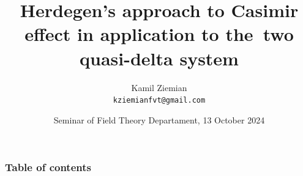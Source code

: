 \documentclass[10pt,t]{beamer}
\title{Herdegen's approach to Casimir effect in application to
  the~two quasi-delta system}
\author{Kamil Ziemian \\
  \texttt{kziemianfvt@gmail.com}}
\date[13 X 2024]{Seminar of Field Theory Departament,
  13 October 2024}
\begin{document}





\RaggedRight





\maketitle





\begin{frame}
  \frametitle{Table of contents}


  \tableofcontents %

\end{frame}
















\end{document}
